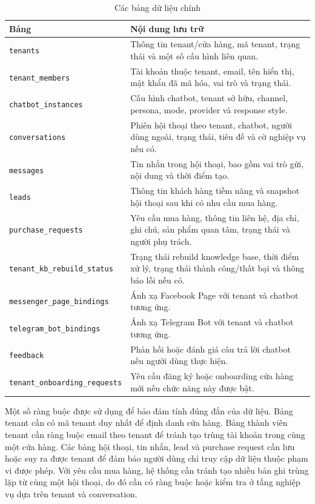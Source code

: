 \documentclass[../DoAn.tex]{subfiles}
\begin{document}
\begin{table}[H]
\centering
\caption{Các bảng dữ liệu chính}
\label{tab:ch4-database-main}
\begin{tabular}{|p{}|p{}|}
\hline
\textbf{Bảng} & \textbf{Nội dung lưu trữ} \\
\hline
\texttt{tenants} & Thông tin tenant/cửa hàng, mã tenant, trạng thái và một số cấu hình liên quan. \\
\hline
\texttt{tenant\_members} & Tài khoản thuộc tenant, email, tên hiển thị, mật khẩu đã mã hóa, vai trò và trạng thái. \\
\hline
\texttt{chatbot\_instances} & Cấu hình chatbot, tenant sở hữu, channel, persona, mode, provider và response style. \\
\hline
\texttt{conversations} & Phiên hội thoại theo tenant, chatbot, người dùng ngoài, trạng thái, tiêu đề và cờ nghiệp vụ nếu có. \\
\hline
\texttt{messages} & Tin nhắn trong hội thoại, bao gồm vai trò gửi, nội dung và thời điểm tạo. \\
\hline
\texttt{leads} & Thông tin khách hàng tiềm năng và snapshot hội thoại sau khi có nhu cầu mua hàng. \\
\hline
\texttt{purchase\_requests} & Yêu cầu mua hàng, thông tin liên hệ, địa chỉ, ghi chú, sản phẩm quan tâm, trạng thái và người phụ trách. \\
\hline
\texttt{tenant\_kb\_rebuild\_status} & Trạng thái rebuild knowledge base, thời điểm xử lý, trạng thái thành công/thất bại và thông báo lỗi nếu có. \\
\hline
\texttt{messenger\_page\_bindings} & Ánh xạ Facebook Page với tenant và chatbot tương ứng. \\
\hline
\texttt{telegram\_bot\_bindings} & Ánh xạ Telegram Bot với tenant và chatbot tương ứng. \\
\hline
\texttt{feedback} & Phản hồi hoặc đánh giá câu trả lời chatbot nếu người dùng thực hiện. \\
\hline
\texttt{tenant\_onboarding\_requests} & Yêu cầu đăng ký hoặc onboarding cửa hàng mới nếu chức năng này được bật. \\
\hline
\end{tabular}
\end{table}

Một số ràng buộc được sử dụng để bảo đảm tính đúng đắn của dữ liệu. Bảng tenant cần có mã tenant duy nhất để định danh cửa hàng. Bảng thành viên tenant cần ràng buộc email theo tenant để tránh tạo trùng tài khoản trong cùng một cửa hàng. Các bảng hội thoại, tin nhắn, lead và purchase request cần lưu hoặc suy ra được tenant để đảm bảo người dùng chỉ truy cập dữ liệu thuộc phạm vi được phép. Với yêu cầu mua hàng, hệ thống cần tránh tạo nhiều bản ghi trùng lặp từ cùng một hội thoại, do đó cần có ràng buộc hoặc kiểm tra ở tầng nghiệp vụ dựa trên tenant và conversation.
\end{document}
